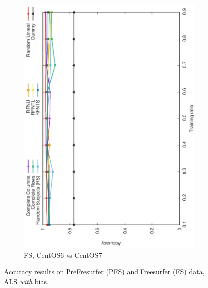 \documentclass[10pt, conference, compsocconf]{IEEEtran}
\begin{document}
\begin{figure}
\begin{subfigure}[b]{0.4\linewidth}
        \includegraphics[width=0.8\columnwidth, angle=-90]{data/results/means_of_results/ALS-Bias/FS-100files/ALS-Bias-FS100files.pdf}
        \caption{FS, CentOS6 vs CentOS7}
\end{subfigure}
\caption{Accuracy results on PreFresurfer (PFS) and Freesurfer (FS) data, ALS \emph{with} bias.}
\label{fig:results-real-als-bias}
\end{figure}
\end{document}

